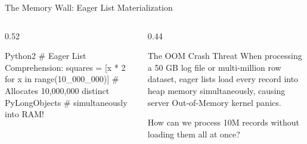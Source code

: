 \begin{frame}[fragile]{The Memory Wall: Eager List Materialization}
  \begin{columns}[T,onlytextwidth]
    \begin{column}{0.52\textwidth}
      \begin{HighlightedCodeBlock}{Python}{2}
# Eager List Comprehension:
squares = [x * 2 for x in range(10_000_000)]
# Allocates 10,000,000 distinct PyLongObjects
# simultaneously into RAM!
      \end{HighlightedCodeBlock}
      \vspace{0.10cm}
    \end{column}
    \begin{column}{0.44\textwidth}
      \begin{WarningBox}{The OOM Crash Threat}
        \scriptsize
        When processing a 50 GB log file or multi-million row dataset, eager lists load every record into heap memory simultaneously, causing server Out-of-Memory kernel panics.
      \end{WarningBox}
      \vspace{0.10cm}
      {\scriptsize\color{UpGradSlate}How can we process 10M records without loading them all at once?}
    \end{column}
  \end{columns}
\end{frame}

